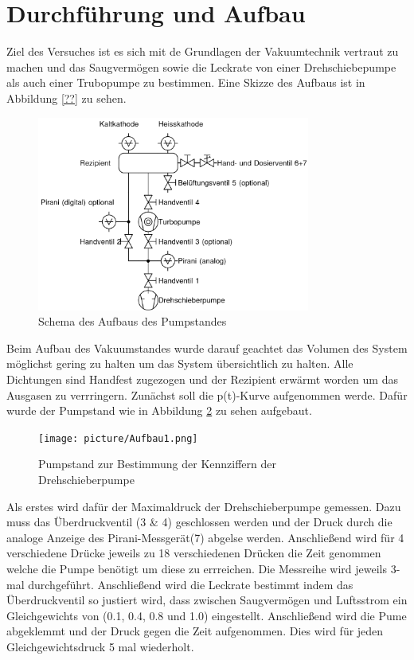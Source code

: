 \section{Durchführung und Aufbau}
\label{sec:Durchführung}
Ziel des Versuches ist es sich mit de Grundlagen der Vakuumtechnik vertraut zu machen und das Saugvermögen sowie die Leckrate von einer Drehschiebepumpe als auch einer Trubopumpe zu bestimmen. Eine Skizze des Aufbaus ist in Abbildung \ref{??} zu sehen. 
\begin{figure}[htpb]
  \centering
\includegraphics[width=0.8\textwidth]{picture/pumpaufbau.png}
\caption{Schema des Aufbaus des Pumpstandes \cite{Pfeiffer}}
  \label{fig:pump}
\end{figure}
Beim Aufbau des Vakuumstandes wurde darauf geachtet das Volumen des System möglichst gering zu halten um das System übersichtlich zu halten. Alle Dichtungen sind Handfest zugezogen und der Rezipient erwärmt worden um das Ausgasen zu verrringern. \newline
Zunächst soll die p(t)-Kurve aufgenommen werde. Dafür wurde der Pumpstand wie in Abbildung \ref{fig:Dreh} zu sehen aufgebaut. 
\begin{figure}[htpb]
  \centering
  \texttt{[image: picture/Aufbau1.png]}
  \caption{Pumpstand zur Bestimmung der Kennziffern der Drehschieberpumpe}
  \label{fig:Dreh}
\end{figure}
Als erstes wird dafür der Maximaldruck der Drehschieberpumpe gemessen. Dazu muss das Überdruckventil (3 \& 4) geschlossen werden und der Druck durch die analoge Anzeige des Pirani-Messgerät(7) abgelse werden. Anschließend wird für 4 verschiedene Drücke jeweils zu 18 verschiedenen Drücken die Zeit genommen welche die Pumpe benötigt um diese zu errreichen. Die Messreihe wird jeweils 3-mal durchgeführt. 
Anschließend wird die Leckrate bestimmt indem das Überdruckventil so justiert wird, dass zwischen Saugvermögen und Luftsstrom ein Gleichgewichts von (0.1, 0.4, 0.8 und 1.0) eingestellt. Anschließend wird die Pume abgeklemmt und der Druck gegen die Zeit aufgenommen. Dies wird für jeden Gleichgewichtsdruck 5 mal wiederholt.  \newline
